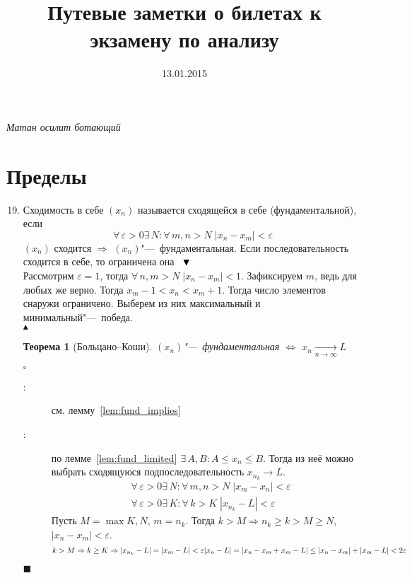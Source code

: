 \documentclass[a4paper,12pt]{article}
\title{Путевые заметки о билетах к экзамену по анализу}
\date{13.01.2015}
\author{}
\theoremstyle{plain}
\newtheorem{thrm}{Теорема}
\theoremstyle{definition}
\theoremstyle{remark}
\newenvironment{ittproof}{$\square$ }{ $\blacksquare$ \\}
\newenvironment{itlproof}{$\phantom{0}\\ \blacktriangledown$ \\ }%
{ \phantom{0}\\ $\blacktriangle$ \\}
\begin{document}
\maketitle
\epigraph{\sl Матан осилит ботающий }{}
\section*{Пределы}
\begin{enumerate}
  \setcounter{enumi}{18}
  \item Сходимость в себе
    {  $(x_n)$ называется сходящейся в себе (фундаментальной), если
      \[
        \forall\,\varepsilon>0 \exists\,N:\forall\,m,n > N\; |x_n - x_m| < \varepsilon 
      \] 
    }
    { \lem\label{lem:fund_implies} $(x_n)$ сходится $\Rightarrow$ $(x_n)$"---~фундаментальная. }
    { \lem\label{lem:fund_limited} Если последовательность сходится в себе, то ограничена она }
    \begin{itlproof}
      Рассмотрим $\varepsilon=1$, тогда $\forall\, n,m > N\; |x_n - x_m| < 1$.
      Зафиксируем $m$, ведь для любых же верно.
      Тогда $x_m-1 < x_n < x_m + 1$. Тогда число элементов снаружи ограничено.
      Выберем из них максимальный и минимальный"---~победа.
    \end{itlproof}
    \begin{thrm}[Больцано--Коши]
      $(x_n)$"---~фундаментальная $\Leftrightarrow$ $x_n\xrightarrow[n\to\infty]{} L$
    \end{thrm}
    \begin{ittproof}
      \begin{description}
        \item[\fbox{$\Leftarrow$} :]  см. лемму~\ref{lem:fund_implies}
        \item[\fbox{$\Rightarrow$} :] по лемме~\ref{lem:fund_limited} $\exists\,A,B:A\leq x_n\leq B$.
          Тогда из неё можно выбрать сходящуюся подпоследовательность $x_{n_k}\to L$.
          \begin{align*}
            &\forall\,\varepsilon>0 \exists\,N : \forall\, m,n > N \; |x_m-x_n| < \varepsilon \\
            &\forall\,\varepsilon>0 \exists\,K : \forall\, k > K \; |x_{n_k} - L| < \varepsilon 
          \end{align*}
          Пусть $M = \max{K,N}$, $m = n_k$. 
          Тогда $k > M \Rightarrow n_k \geq k > M \geq N$, $|x_n - x_m| < \varepsilon$.
          \[
            k > M \Rightarrow k \geq K \Rightarrow |x_{n_k} - L | = |x_m - L| < \varepsilon \\
            |x_n - L| = |x_n - x_m + x_m - L| \leq |x_n - x_m | + |x_m - L| < 2\varepsilon 
          \]
      \end{description}
    \end{ittproof}
\end{enumerate}
\end{document}

